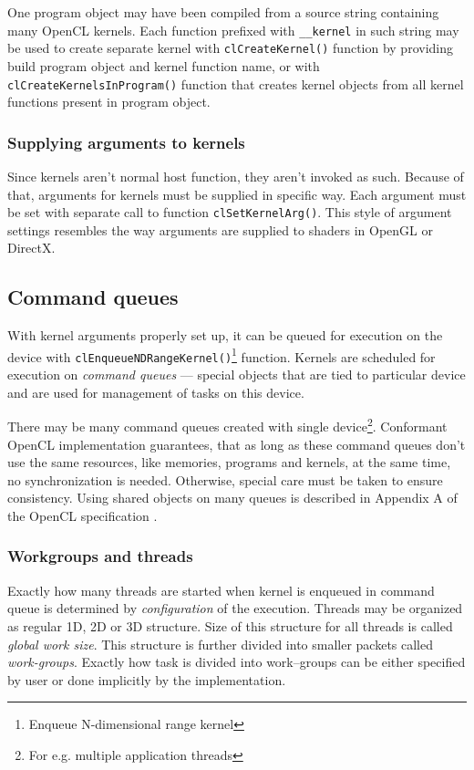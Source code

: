 One program object may have been compiled from a source string containing many
OpenCL kernels. Each function prefixed with \texttt{\_\_kernel} in such string
may be used to create separate kernel with \texttt{clCreateKernel()} function by
providing build program object and kernel function name, or with
\texttt{clCreateKernelsInProgram()} function that creates kernel objects from
all kernel functions present in program object.

\subsubsection{Supplying arguments to kernels}

Since kernels aren't normal host function, they aren't invoked as such. Because
of that, arguments for kernels must be supplied in specific way. Each argument
must be set with separate call to function \texttt{clSetKernelArg()}. This style
of argument settings resembles the way arguments are supplied to shaders in OpenGL
or DirectX.

\subsection{Command queues}

With kernel arguments properly set up, it can be queued for execution on the
device with \texttt{clEnqueueNDRangeKernel()}\footnote{Enqueue N-dimensional range kernel}
function. Kernels are scheduled for execution on \emph{command queues} --- special
objects that are tied to particular device and are used for management of tasks
on this device.

There may be many command queues created with single
device\footnote{For e.g. multiple application threads}. Conformant OpenCL
implementation guarantees, that as long as these command queues don't use the
same resources, like memories, programs and kernels, at the same time, no
synchronization is needed. Otherwise, special care must be taken to ensure
consistency. Using shared objects on many queues is described in Appendix A
of the OpenCL specification \parencite{openclspec}.

\subsubsection{Workgroups and threads}
\label{subsub:clworkgroups}

Exactly how many threads are started when kernel is enqueued in command queue
is determined by \emph{configuration} of the execution. Threads may be organized
as regular 1D, 2D or 3D structure. Size of this structure for all threads is
called \emph{global work size}. This structure is further divided into smaller
packets called \emph{work-groups}. Exactly how task is divided into work--groups
can be either specified by user or done implicitly by the implementation.

